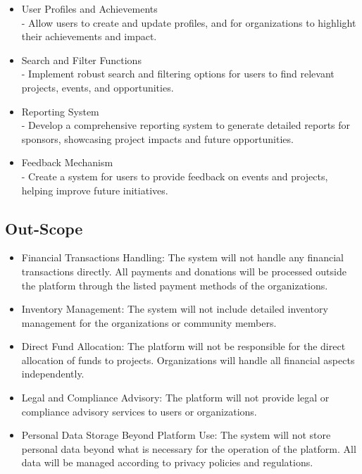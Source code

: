 \begin{itemize}
	\item User Profiles and Achievements\\
        - Allow users to create and update profiles, and for organizations to highlight their achievements and impact.
 
        \item Search and Filter Functions\\
        - Implement robust search and filtering options for users to find relevant projects, events, and opportunities.

        \item Reporting System\\
        - Develop a comprehensive reporting system to generate detailed reports for sponsors, showcasing project impacts and future opportunities.

        \item Feedback Mechanism\\
        - Create a system for users to provide feedback on events and projects, helping improve future initiatives.
	
\end{itemize}

\newpage

\subsection{Out-Scope}

\begin{itemize}
        \item Financial Transactions Handling: The system will not handle any financial transactions directly. All payments and donations will be processed outside the platform through the listed payment methods of the organizations.
        \item Inventory Management: The system will not include detailed inventory management for the organizations or community members.
        \item Direct Fund Allocation: The platform will not be responsible for the direct allocation of funds to projects. Organizations will handle all financial aspects independently.
        \item Legal and Compliance Advisory: The platform will not provide legal or compliance advisory services to users or organizations.
        \item Personal Data Storage Beyond Platform Use: The system will not store personal data beyond what is necessary for the operation of the platform. All data will be managed according to privacy policies and regulations.
\end{itemize}